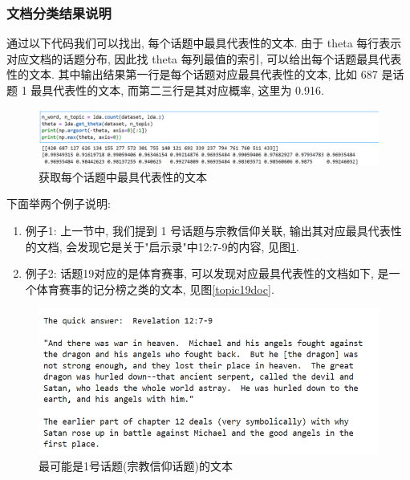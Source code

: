 \documentclass[UTF8]{article}
\begin{document}
\subsubsection{文档分类结果说明}
通过以下代码我们可以找出, 每个话题中最具代表性的文本. 由于 theta 每行表示对应文档的话题分布, 因此找 theta 每列最值的索引, 可以给出每个话题最具代表性的文本. 其中输出结果第一行是每个话题对应最具代表性的文本, 比如 687 是话题 1 最具代表性的文本, 而第二三行是其对应概率, 这里为 0.916.
\begin{center}
\begin{figure}[H]
	\centering
	\includegraphics[width=\linewidth]{image/doctopic.png}
	\caption{获取每个话题中最具代表性的文本}
\end{figure}
\end{center}
下面举两个例子说明:
\begin{enumerate}[1. ]
\item 例子1: 上一节中, 我们提到 1 号话题与宗教信仰关联, 输出其对应最具代表性的文档, 会发现它是关于"启示录"中12:7-9的内容, 见图\ref{topic1doc}.
\item 例子2: 话题19对应的是体育赛事, 可以发现对应最具代表性的文档如下, 是一个体育赛事的记分榜之类的文本, 见图\ref{topic19doc}.
\end{enumerate}
\begin{minipage}{\linewidth/2}
\begin{figure}[H]
	\centering
	\includegraphics[width=\linewidth]{image/topic1doc.png}
	\caption{最可能是1号话题(宗教信仰话题)的文本}
	\label{topic1doc}
\end{figure}
\end{minipage}
\end{document}
